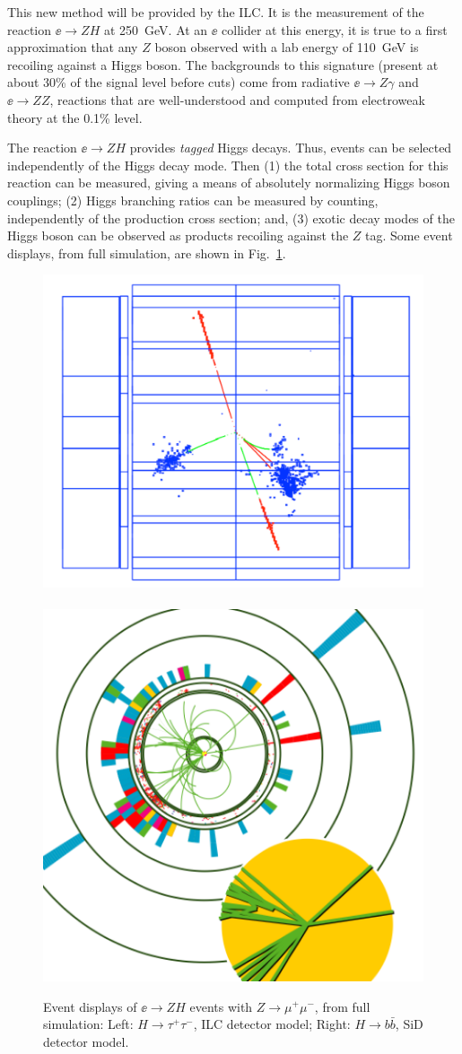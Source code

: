 This new method will be provided by the ILC.  It is the measurement of the reaction $\ee\to ZH$ at 250~GeV.   At an $\ee$ collider at this energy, it is true to a first approximation that any $Z$ boson observed with a lab energy of  110~GeV is recoiling against a Higgs boson.   The backgrounds to this signature (present at about 30\% of the signal level before cuts)  come from radiative $\ee\to Z\gamma$ and $\ee\to ZZ$, reactions that are well-understood and computed from electroweak theory at the 0.1\% level. 

The reaction $\ee\to ZH$ provides {\it tagged} Higgs decays.   Thus, events can be selected independently of the Higgs decay mode.  Then (1) the  total cross section for this reaction can be measured, giving a means of absolutely normalizing Higgs boson couplings; (2)  Higgs branching ratios can be measured  by counting, independently of the production cross section; and, (3)  exotic decay modes of the Higgs boson can be observed as products recoiling against the $Z$ tag.   Some event displays, from full 
simulation, are shown in Fig.~\ref{fig:HiggsEvents}. 

\begin{figure}
\begin{center}
\includegraphics[width=0.5\hsize]{chapters/figures/htotautau.pdf}\ \ 
\includegraphics[width=0.40\hsize]{chapters/figures/htobb.pdf}
\end{center}
\caption{Event displays of $\ee\to ZH$ events  with $Z\to \mu^+\mu^-$, from full simulation: Left: $H\to \tau^+\tau^-$, ILC detector model;  Right: $H\to b\bar b$, SiD detector model.}
\label{fig:HiggsEvents}
\end{figure}

